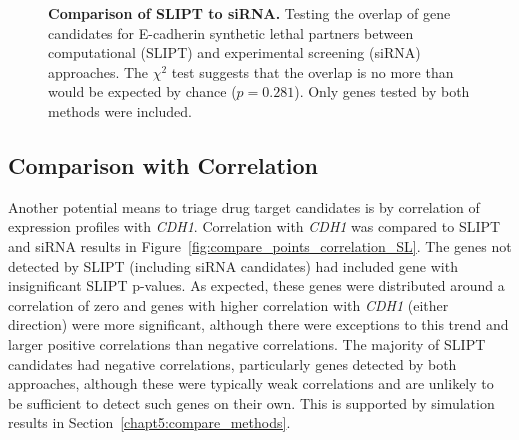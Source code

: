 \begin{figure}[!ht]
  \centering
    \caption[Comparison of SLIPT to siRNA]{\small \textbf{Comparison of \gls{SLIPT} to \gls{siRNA}.} Testing the overlap of gene candidates for E-cadherin synthetic lethal partners between computational (\gls{SLIPT}) and experimental screening (\gls{siRNA}) approaches. The $\chi^2$ test suggests that the overlap is no more than would be expected by chance ($p = 0.281$).  Only genes tested by both methods were included. %
}
\label{fig:Venn_allgenes}
\end{figure}


\FloatBarrier

\subsection{Comparison with Correlation} \label{chapt3:compare_correlation} 

Another potential means to triage drug target candidates is by correlation of expression profiles with \textit{CDH1}. Correlation with \textit{CDH1} was compared to \gls{SLIPT} and \gls{siRNA} results in Figure~\ref{fig:compare_points_correlation_SL}. The genes not detected by \gls{SLIPT} (including \gls{siRNA} candidates) had included gene with insignificant \gls{SLIPT} p-values. As expected, these genes were distributed around a correlation of zero and genes with higher correlation with \textit{CDH1} (either direction) were more significant, although there were exceptions to this trend and larger positive correlations than negative correlations. The majority of \gls{SLIPT} candidates had negative correlations, particularly genes detected by both approaches, although these were typically weak correlations and are unlikely to be sufficient to detect such genes on their own. This is supported by simulation results in Section~\ref{chapt5:compare_methods}.

